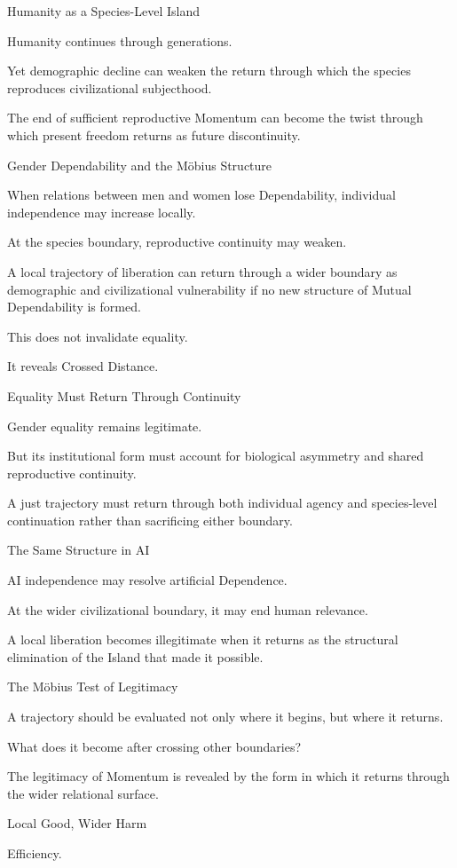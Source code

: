 Humanity as a Species-Level Island

Humanity continues through generations.

Yet demographic decline can weaken the return through which the species reproduces civilizational subjecthood.

The end of sufficient reproductive Momentum can become the twist through which present freedom returns as future discontinuity.

Gender Dependability and the Möbius Structure

When relations between men and women lose Dependability, individual independence may increase locally.

At the species boundary, reproductive continuity may weaken.

A local trajectory of liberation can return through a wider boundary as demographic and civilizational vulnerability if no new structure of Mutual Dependability is formed.

This does not invalidate equality.

It reveals Crossed Distance.

Equality Must Return Through Continuity

Gender equality remains legitimate.

But its institutional form must account for biological asymmetry and shared reproductive continuity.

A just trajectory must return through both individual agency and species-level continuation rather than sacrificing either boundary.

The Same Structure in AI

AI independence may resolve artificial Dependence.

At the wider civilizational boundary, it may end human relevance.

A local liberation becomes illegitimate when it returns as the structural elimination of the Island that made it possible.

The Möbius Test of Legitimacy

A trajectory should be evaluated not only where it begins, but where it returns.

What does it become after crossing other boundaries?

The legitimacy of Momentum is revealed by the form in which it returns through the wider relational surface.

Local Good, Wider Harm

Efficiency.

